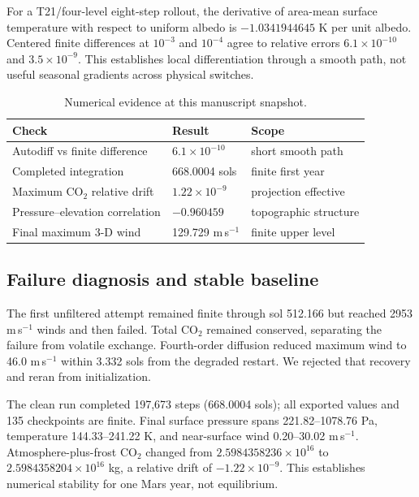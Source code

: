 \documentclass{article}
\begin{document}
For a T21/four-level eight-step rollout, the derivative of area-mean surface
temperature with respect to uniform albedo is \(-1.0341944645\) K per unit
albedo. Centered finite differences at \(10^{-3}\) and \(10^{-4}\) agree to
relative errors \(6.1\times10^{-10}\) and \(3.5\times10^{-9}\). This establishes
local differentiation through a smooth path, not useful seasonal gradients
across physical switches.

\begin{table}[t]\centering\small
\caption{Numerical evidence at this manuscript snapshot.}\label{tab:num}
\begin{tabular}{lll}\toprule
Check & Result & Scope\\\midrule
Autodiff vs finite difference & \(6.1\times10^{-10}\) & short smooth path\\
Completed integration & 668.0004 sols & finite first year\\
Maximum CO\(_2\) relative drift & \(1.22\times10^{-9}\) & projection effective\\
Pressure--elevation correlation & \(-0.960459\) & topographic structure\\
Final maximum 3-D wind & 129.729 m\,s\(^{-1}\) & finite upper level\\\bottomrule
\end{tabular}
\end{table}

\subsection{Failure diagnosis and stable baseline}
The first unfiltered attempt remained finite through sol 512.166 but reached
2953 m\,s\(^{-1}\) winds and then failed. Total \(\mathrm{CO_2}\) remained
conserved, separating the failure from volatile exchange. Fourth-order diffusion
reduced maximum wind to 46.0 m\,s\(^{-1}\) within 3.332 sols from the degraded
restart. We rejected that recovery and reran from initialization.

The clean run completed 197,673 steps (668.0004 sols); all exported values and
135 checkpoints are finite. Final surface pressure spans 221.82--1078.76 Pa,
temperature 144.33--241.22 K, and near-surface wind 0.20--30.02 m\,s\(^{-1}\).
Atmosphere-plus-frost \(\mathrm{CO_2}\) changed from
\(2.5984358236\times10^{16}\) to \(2.5984358204\times10^{16}\) kg, a relative
drift of \(-1.22\times10^{-9}\). This establishes numerical stability for one
Mars year, not equilibrium.
\end{document}
